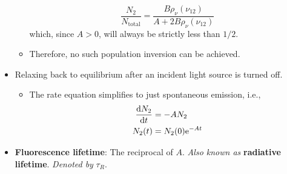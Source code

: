 \documentclass[../notes.tex]{subfiles}
\begin{document}
\begin{itemize}
\begin{itemize}
        \begin{equation*}
            \frac{N_2}{N_\text{total}} = \frac{B\rho_\nu(\nu_{12})}{A+2B\rho_\nu(\nu_{12})}
        \end{equation*}
        which, since $A>0$, will always be strictly less than $1/2$.
        \item Therefore, no such population inversion can be achieved.
    \end{itemize}
    \item Relaxing back to equilibrium after an incident light source is turned off.
    \begin{itemize}
        \item The rate equation simplifies to just spontaneous emission, i.e.,
        \begin{align*}
            \dv{N_2}{t} &= -AN_2\\
            N_2(t) &= N_2(0)\e[-At]
        \end{align*}
    \end{itemize}
    \item \textbf{Fluorescence lifetime}: The reciprocal of $A$. \emph{Also known as} \textbf{radiative lifetime}. \emph{Denoted by} $\tau_R$.
\end{itemize}
\end{document}
